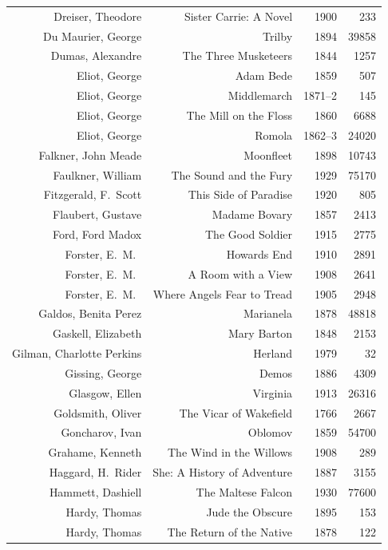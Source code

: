\documentclass{article} %
\begin{document}
\begin{center}
\begin{tabularx}{\linewidth}{RRrr}
    Dreiser, Theodore & Sister Carrie: A Novel & 1900 & 233 \\
    Du Maurier, George & Trilby & 1894 & 39858 \\
    Dumas, Alexandre & The Three Musketeers & 1844 & 1257 \\
    Eliot, George & Adam Bede & 1859 & 507 \\
    Eliot, George & Middlemarch & 1871--2 & 145 \\
    Eliot, George & The Mill on the Floss & 1860 & 6688 \\
    Eliot, George & Romola & 1862--3 & 24020 \\
    Falkner, John Meade & Moonfleet & 1898 & 10743 \\
    Faulkner, William & The Sound and the Fury & 1929 & 75170 \\
    Fitzgerald, F.\ Scott & This Side of Paradise & 1920 & 805 \\
    Flaubert, Gustave & Madame Bovary & 1857 & 2413 \\
    Ford, Ford Madox & The Good Soldier & 1915 & 2775 \\
    Forster, E.\ M.\ & Howards End & 1910 & 2891 \\
    Forster, E.\ M.\ & A Room with a View & 1908 & 2641 \\
    Forster, E.\ M.\ & Where Angels Fear to Tread & 1905 & 2948 \\
    Galdos, Benita Perez & Marianela & 1878 & 48818 \\
    Gaskell, Elizabeth & Mary Barton & 1848 & 2153 \\
    Gilman, Charlotte Perkins & Herland & 1979 & 32 \\
    Gissing, George & Demos & 1886 & 4309 \\
    Glasgow, Ellen & Virginia & 1913 & 26316 \\
    Goldsmith, Oliver & The Vicar of Wakefield & 1766 & 2667 \\
    Goncharov, Ivan & Oblomov & 1859 & 54700 \\
    Grahame, Kenneth & The Wind in the Willows & 1908 & 289 \\
    Haggard, H.\ Rider & She: A History of Adventure & 1887 & 3155 \\
    Hammett, Dashiell & The Maltese Falcon & 1930 & 77600 \\
    Hardy, Thomas & Jude the Obscure & 1895 & 153 \\
    Hardy, Thomas & The Return of the Native & 1878 & 122 \\

\end{tabularx}
\end{center}
\end{document}
